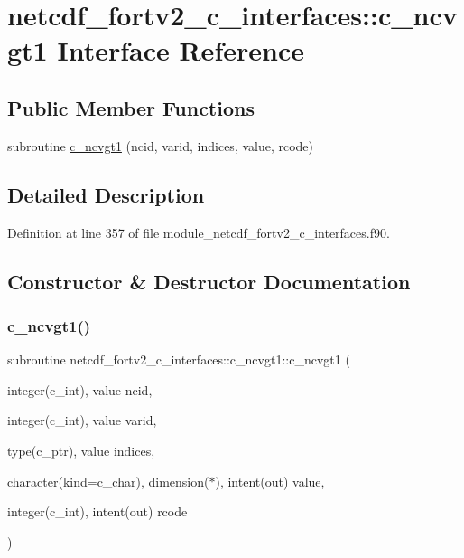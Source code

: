 \hypertarget{interfacenetcdf__fortv2__c__interfaces_1_1c__ncvgt1}{}\section{netcdf\+\_\+fortv2\+\_\+c\+\_\+interfaces\+:\+:c\+\_\+ncvgt1 Interface Reference}
\label{interfacenetcdf__fortv2__c__interfaces_1_1c__ncvgt1}
\subsection*{Public Member Functions}
\begin{DoxyCompactItemize}
\item 
subroutine \hyperlink{interfacenetcdf__fortv2__c__interfaces_1_1c__ncvgt1_aaafdb1960e3876750edb0cdd430a4650}{c\+\_\+ncvgt1} (ncid, varid, indices, value, rcode)
\end{DoxyCompactItemize}


\subsection{Detailed Description}


Definition at line 357 of file module\+\_\+netcdf\+\_\+fortv2\+\_\+c\+\_\+interfaces.\+f90.



\subsection{Constructor \& Destructor Documentation}
\mbox{\label{interfacenetcdf__fortv2__c__interfaces_1_1c__ncvgt1_aaafdb1960e3876750edb0cdd430a4650}} 
\subsubsection{\texorpdfstring{c\+\_\+ncvgt1()}{c\_ncvgt1()}}
{\footnotesize\ttfamily subroutine netcdf\+\_\+fortv2\+\_\+c\+\_\+interfaces\+::c\+\_\+ncvgt1\+::c\+\_\+ncvgt1 (\begin{DoxyParamCaption}\item[{integer(c\+\_\+int), value}]{ncid,  }\item[{integer(c\+\_\+int), value}]{varid,  }\item[{type(c\+\_\+ptr), value}]{indices,  }\item[{character(kind=c\+\_\+char), dimension($\ast$), intent(out)}]{value,  }\item[{integer(c\+\_\+int), intent(out)}]{rcode }\end{DoxyParamCaption})}



